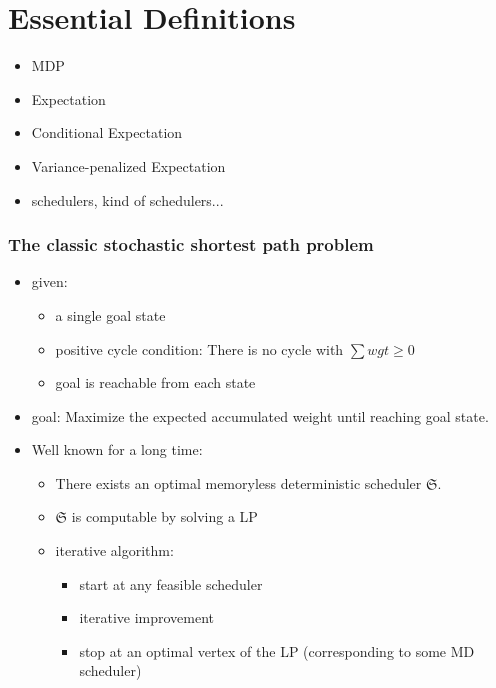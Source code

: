 \documentclass[onlymath]{beamer}
\begin{document}
\section{Essential Definitions}

\begin{frame}
\begin{itemize}
	\item MDP
	\item Expectation
	\item Conditional Expectation
	\item Variance-penalized Expectation
	\item schedulers, kind of schedulers...
\end{itemize}
\end{frame}

\begin{frame}
\frametitle{The classic stochastic shortest path problem}
	\begin{itemize}
		\item given:
		\begin{itemize}
			\item a single goal state
			\item positive cycle condition: There is no cycle with $\sum{wgt} \geq 0$
			\item goal is reachable from each state
		\end{itemize}
		\item goal: Maximize the expected accumulated weight until reaching goal state.
		\item Well known for a long time:
		\begin{itemize}
			\item There exists an optimal memoryless deterministic scheduler $\mathfrak{S}$.
			\item $\mathfrak{S}$ is computable by solving a LP
			\item iterative algorithm:
			\begin{itemize}
				\item start at any feasible scheduler
				\item iterative improvement
				\item stop at an optimal vertex of the LP (corresponding to some MD scheduler)
			\end{itemize}
		\end{itemize}
	\end{itemize}
\end{frame}%
\end{document}
